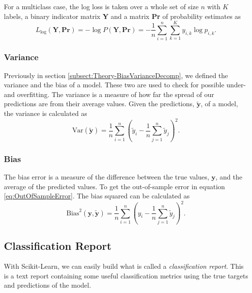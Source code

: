 \documentclass[a4paper, american, 12pt]{report}
\begin{document}
	For a multiclass case, the log loss is taken over a whole set of size $n$ with $K$ labels, a binary indicator matrix \textbf{Y} and a matrix \textbf{Pr} of probability estimates as
	\begin{equation}
	\label{eq:LogLossMulti}
		L_{\text{log}}(\textbf{Y},\textbf{Pr})=-\log P(\textbf{Y},\textbf{Pr})=-\frac{1}{n}\sum_{i=1}^{n}\sum_{k=1}^{K}y_{i,k}\log p_{i,k}.
	\end{equation}


	\subsubsection{Variance}
	\label{subsubsect:Theory-Variance}
	Previously in section \ref{subsect:Theory-BiasVarianceDecomp}, we defined the variance and the bias of a model. These two are used to check for possible under- and overfitting. The variance is a measure of how far the spread of our predictions are from their average values. Given the predictions, $\tilde{\textbf{y}}$, of a model, the variance is calculated as
	\begin{equation}
	\label{eq:VarianceClass}
		\text{Var}(\tilde{\textbf{y}})=\frac{1}{n}\sum_{i=1}^n(\tilde{y}_i-\frac{1}{n}\sum_{j=1}^n\tilde{y}_j)^2.
	\end{equation}

	
	\subsubsection{Bias}
	\label{subsubsect:Theory-Bias}
	The bias error is a measure of the difference between the true values, $\textbf{y}$, and the average of the predicted values. To get the out-of-sample error in equation \ref{eq:OutOfSampleError}. The bias squared can be calculated as
	\begin{equation}
	\label{eq:BiasClass}
		\text{Bias}^2(\textbf{y}, \tilde{\textbf{y}})=\frac{1}{n}\sum_{i=1}^n(y_i-\frac{1}{n}\sum_{j=1}^n\tilde{y}_j)^2.
	\end{equation}
	
	
	\subsection{Classification Report}
	\label{subsect:Theory-ClassReport}
	With Scikit-Learn, we can easily build what is called a \textit{classification report}. This is a text report containing some useful classification metrics using the true targets and predictions of the model.
	
\end{document}
